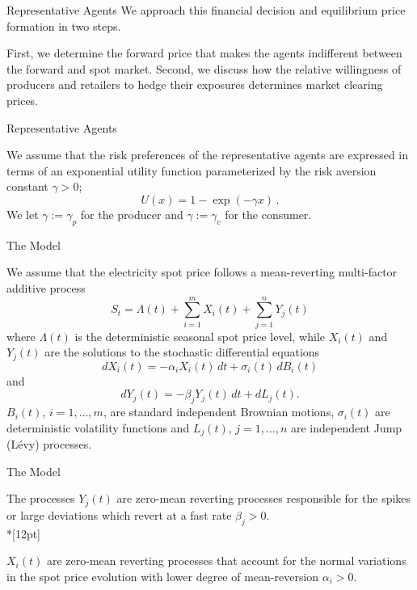 {Representative Agents}
We approach this financial decision and
equilibrium price formation in two steps.


 First, we determine the
forward price that makes the agents indifferent between the forward
and spot market.
 Second, we discuss how the relative willingness
of producers and retailers to hedge their exposures determines
market clearing prices.




{Representative Agents}

We assume that the risk preferences of the representative agents are
expressed in terms of an exponential utility function parameterized
by the risk aversion constant $\gamma>0$;
$$
U(x)=1-\exp(-\gamma x)\,.
$$
We let $\gamma:=\gamma_p$ for the producer and $\gamma:=\gamma_c$
for the consumer.



{The Model}

We assume that the electricity spot price follows a
mean-reverting multi-factor additive process
\begin{equation}\label{equation for additive stock price}
S_t=\Lambda(t)+\sum_{i=1}^mX_i(t)+\sum_{j=1}^nY_j(t)
\end{equation}
where $\Lambda(t)$ is the deterministic seasonal spot price level,
while $X_i(t)$ and $Y_j(t)$ are the solutions to the stochastic
differential equations
\begin{equation}
dX_i(t)=-\alpha_i X_i(t)\,dt+\sigma_i(t)\,dB_i(t)
\end{equation}
and
\begin{equation}
dY_j(t)=-\beta_j Y_j(t)\,dt+dL_j(t).
\end{equation}
$B_i(t)$, $i=1,\ldots,m$, are standard independent Brownian
motions, $\sigma_i(t)$ are deterministic volatility functions
and $L_j(t)$, $j=1,\ldots,n$ are independent Jump (L\'evy)
processes.


{The Model}

The processes $Y_j(t)$ are
zero-mean reverting processes responsible for the spikes or large
deviations which revert at a fast rate $\beta_j>0$.\\*[12pt]

$X_i(t)$
are zero-mean reverting processes that account for the normal
variations in the spot price evolution with lower degree of
mean-reversion $\alpha_i>0$.





